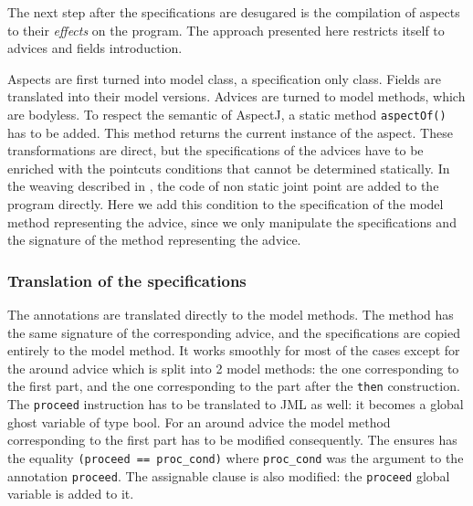 The next step after the specifications are desugared is the
compilation of aspects to their {\it effects} on the program. The
approach presented here restricts itself to advices and fields 
introduction. 

Aspects are first turned into model class, a specification only class.
Fields are translated into their model versions.
Advices are turned to model methods, which are bodyless.
To respect the semantic of AspectJ, a static method {\tt aspectOf()}
has to be added. This method returns the current instance of the aspect.
These transformations are direct, but the
specifications of the advices have to be enriched with the pointcuts
conditions that cannot be determined statically.  In the weaving
described in \cite{weaving04}, the code of non static joint point are
added to the program directly.  Here we add this condition to the
specification of the model method representing the advice, since we
only manipulate the specifications and the signature of the method
representing the advice.

\vspace{-0.4cm}
\subsubsection{Translation of the specifications}
The annotations are translated directly to the model methods. The
method has the same signature of the corresponding advice, and the
specifications are copied entirely to the model method. It works
smoothly for most of the cases except for the around advice which is
split into 2 model methods: the one corresponding to the first part,
and the one corresponding to the part after the {\tt then}
construction.  The {\tt proceed} instruction has to be translated to
 JML as well: it becomes a global ghost variable of type bool.  For an
 around advice the model method corresponding to the first part has to
 be modified consequently.  The ensures has the equality {\tt (proceed
 == proc\_cond)} where {\tt proc\_cond} was the argument to the
 annotation {\tt proceed}. The assignable clause is also modified: the
 {\tt proceed} global variable is added to it.
